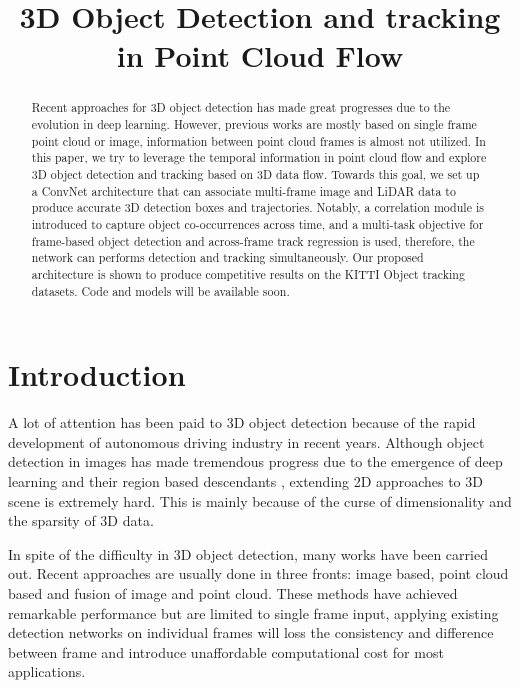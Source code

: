 \documentclass{bmvc2k}
\title{3D Object Detection and tracking in Point Cloud Flow}
\begin{document}
\maketitle
\begin{abstract}
Recent approaches for 3D object detection has made great progresses due to the evolution in deep learning. However, previous works are mostly based on single frame point cloud or image, information between point cloud frames is almost not utilized. In this paper, we try to leverage the temporal information in point cloud flow and explore 3D object detection and tracking based on 3D data flow. Towards this goal, we set up a ConvNet architecture that can associate multi-frame image and LiDAR data to produce accurate 3D detection boxes and trajectories. Notably, a correlation module is introduced to capture object co-occurrences across time, and a multi-task objective for frame-based object detection and across-frame track regression is used, therefore, the network can performs detection and tracking simultaneously. Our proposed architecture is shown to produce competitive results on the KITTI Object tracking datasets. Code and models will be available soon.
\end{abstract}

\section{Introduction}
\label{sec:intro}
A lot of attention has been paid to 3D object detection because of the rapid development of  autonomous driving industry in recent years. Although object detection in images has made tremendous progress due to the emergence of deep learning \cite{krizhevsky2012imagenet, simonyan2014very, he2016deep} and their region based descendants \cite{dai2016r, girshick2015fast, ren2015faster}, extending 2D approaches to 3D scene is extremely hard. This is mainly because of the curse of dimensionality and the sparsity of 3D data. 

In spite of the difficulty in 3D object detection, many works have been carried out. Recent approaches are usually done in three fronts: image based, point cloud based and fusion of image and point cloud. These methods have achieved remarkable performance but are limited to single frame input, applying existing detection networks on individual frames will loss the consistency and difference between frame and introduce unaffordable computational cost for most applications.
\end{document}

